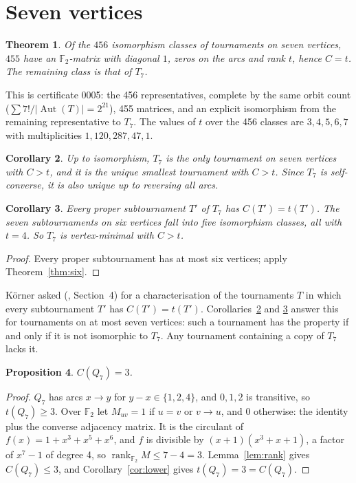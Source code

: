 \documentclass[11pt]{article}
\newtheorem{theorem}{Theorem}
\newtheorem{proposition}[theorem]{Proposition}
\newtheorem{corollary}[theorem]{Corollary}
\theoremstyle{definition}
\theoremstyle{remark}
\newcommand{\F}{\mathbb{F}}
\newcommand{\rk}{\operatorname{rank}}
\newcommand{\Aut}{\operatorname{Aut}}
\begin{document}
\section{Seven vertices}\label{sec:seven}

\begin{theorem}\label{thm:seven}
Of the $456$ isomorphism classes of tournaments on seven vertices, $455$ have an $\F_2$-matrix with
diagonal $1$, zeros on the arcs and rank $t$, hence $C = t$. The remaining class is that of $T_7$.
\end{theorem}

This is certificate 0005: the 456 representatives, complete by the same orbit count
($\sum 7!/|\Aut(T)| = 2^{21}$), 455 matrices, and an explicit isomorphism from the remaining
representative to $T_7$. The values of $t$ over the 456 classes are $3, 4, 5, 6, 7$ with
multiplicities $1, 120, 287, 47, 1$.

\begin{corollary}\label{cor:unique}
Up to isomorphism, $T_7$ is the only tournament on seven vertices with $C > t$, and it is the unique
smallest tournament with $C > t$. Since $T_7$ is self-converse, it is also unique up to reversing
all arcs.
\end{corollary}

\begin{corollary}\label{cor:hered}
Every proper subtournament $T'$ of $T_7$ has $C(T') = t(T')$. The seven subtournaments on six vertices
fall into five isomorphism classes, all with $t = 4$. So $T_7$ is vertex-minimal with $C > t$.
\end{corollary}

\begin{proof}
Every proper subtournament has at most six vertices; apply Theorem~\ref{thm:six}.
\end{proof}

K\"orner asked (\cite{alon}, Section~4) for a characterisation of the tournaments $T$ in which every
subtournament $T'$ has $C(T') = t(T')$. Corollaries~\ref{cor:unique} and \ref{cor:hered} answer this
for tournaments on at most seven vertices: such a tournament has the property if and only if it is
not isomorphic to $T_7$. Any tournament containing a copy of $T_7$ lacks it.

\begin{proposition}\label{prop:q7}
$C(Q_7) = 3$.
\end{proposition}

\begin{proof}
$Q_7$ has arcs $x \to y$ for $y - x \in \{1, 2, 4\}$, and $0, 1, 2$ is transitive, so $t(Q_7) \ge 3$.
Over $\F_2$ let $M_{uv} = 1$ if $u = v$ or $v \to u$, and $0$ otherwise: the identity plus the
converse adjacency matrix. It is the circulant of $f(x) = 1 + x^3 + x^5 + x^6$, and $f$ is
divisible by $(x + 1)(x^3 + x + 1)$, a factor of $x^7 - 1$ of degree 4, so $\rk_{\F_2} M \le 7 - 4 = 3$.
Lemma~\ref{lem:rank} gives $C(Q_7) \le 3$, and Corollary~\ref{cor:lower} gives $t(Q_7) = 3 = C(Q_7)$.
\end{proof}
\end{document}
